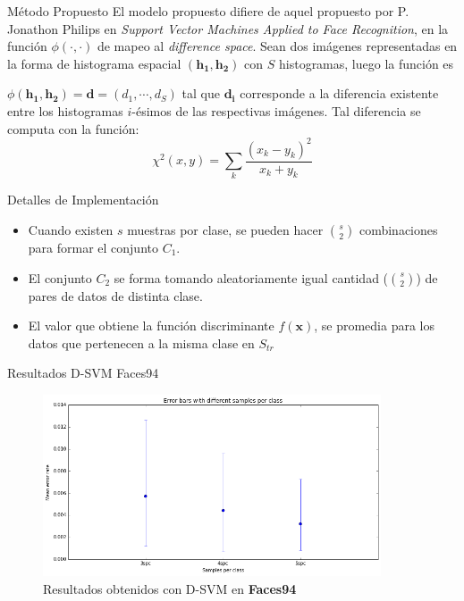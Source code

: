 \documentclass{beamer}
\begin{document}
\begin{frame}{Método Propuesto}
El modelo propuesto difiere de aquel propuesto por P. Jonathon Philips en \textit{Support Vector Machines Applied to Face Recognition}, en la función $\phi(\cdot,\cdot)$ de mapeo al \textit{difference space}. Sean dos imágenes representadas en la forma de histograma espacial $(\mathbf{h_1},\mathbf{h_2})$ con $S$ histogramas, luego la función es

\begin{definition}
    $\phi(\mathbf{h_1}, \mathbf{h_2}) = \mathbf{d} = (d_1, \cdots, d_S)$ tal que $\mathbf{d_i}$ corresponde a la diferencia existente entre los histogramas $i$-ésimos de las respectivas imágenes. Tal diferencia se computa con la función:
    $$\chi^2(x,y) = \sum_k \frac{(x_k - y_k)^2}{x_k + y_k}$$
\end{definition}
\end{frame}


\begin{frame}{Detalles de Implementación}
\begin{itemize}
    \item Cuando existen $s$ muestras por clase, se pueden hacer $\binom{s}{2}$ combinaciones para formar el conjunto $C_1$.
    \item El conjunto $C_2$ se forma tomando aleatoriamente igual cantidad ($\binom{s}{2}$) de pares de datos de distinta clase.
    \item El valor que obtiene la función discriminante $f(\mathbf{x})$, se promedia para los datos que pertenecen a la misma clase en $S_{tr}$
\end{itemize}
\end{frame}


\begin{frame}{Resultados D-SVM Faces94}
\begin{figure}[htpb!]
\centering
\includegraphics[width=10cm]{dsvm_res94}
\caption{Resultados obtenidos con D-SVM en \textbf{Faces94}}
\end{figure}
\end{frame}
\end{document}

